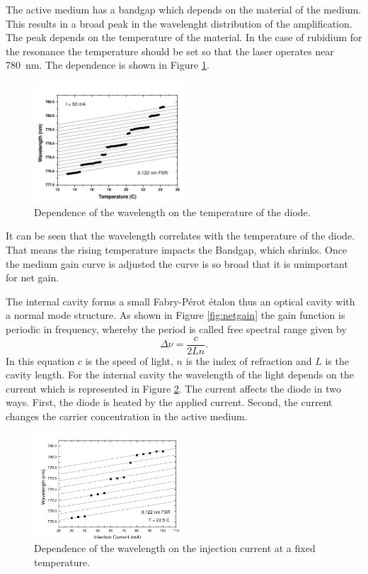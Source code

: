 The active medium has a bandgap which depends on the material of the medium. This results in a broad peak in the wavelenght distribution of the amplification.
The peak depends on the temperature of the material. In the case of rubidium for the resonance the temperature should be set so that the laser operates near 
\qty{780}{\nano\meter}.
The dependence is shown in Figure \ref{fig:temp}.
\begin{figure}[H]
    \centering
    \includegraphics[width=0.5\textwidth]{content/graphics/wavelenghttotemperature.jpg}
    \caption{Dependence of the wavelength on the temperature of the diode. \cite{diode_laser}} %
    \label{fig:temp}
\end{figure}
It can be seen that the wavelength correlates with the temperature of the diode.
That means the rising temperature impacts the Bandgap, which shrinks.
Once the medium gain curve is adjusted the curve is so broad that it is unimportant for net gain.

The internal cavity forms a small Fabry-Pérot étalon thus an optical cavity with a normal mode structure. As shown in Figure \ref{fig:netgain} the gain function
is periodic in frequency, whereby the period is called free spectral range given by
\begin{equation}
    \Delta \nu = \frac{c}{2Ln}.
\end{equation}
In this equation $c$ is the speed of light, $n$ is the index of refraction and $L$ is the cavity length.
For the internal cavity the wavelength of the light depends on the current which is represented in Figure \ref{fig:cur}.
The current affects the diode in two ways. First, the diode is heated by the applied current. Second, the current changes the carrier concentration
in the active medium.
\begin{figure}[H]
    \centering
    \includegraphics[width=0.5\textwidth]{content/graphics/current.jpg}
    \caption{Dependence of the wavelength on the injection current at a fixed temperature. \cite{diode_laser}} %
    \label{fig:cur}
\end{figure}

